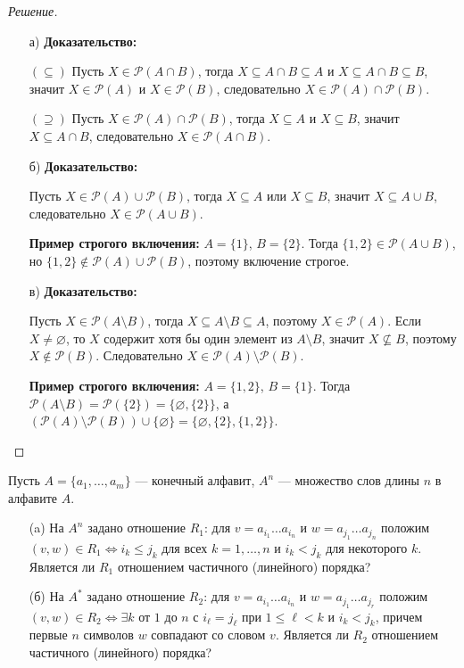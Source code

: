 \documentclass{article}
\begin{document}
\begin{proof}[Решение]\
\begin{enumerate}
    \item[а)] \textbf{Доказательство:}
    
    $(\subseteq)$ Пусть $X \in \mathcal{P}(A \cap B)$, тогда $X \subseteq A \cap B \subseteq A$ и $X \subseteq A \cap B \subseteq B$, значит $X \in \mathcal{P}(A)$ и $X \in \mathcal{P}(B)$, следовательно $X \in \mathcal{P}(A) \cap \mathcal{P}(B)$.
    
    $(\supseteq)$ Пусть $X \in \mathcal{P}(A) \cap \mathcal{P}(B)$, тогда $X \subseteq A$ и $X \subseteq B$, значит $X \subseteq A \cap B$, следовательно $X \in \mathcal{P}(A \cap B)$.
    
    \item[б)] \textbf{Доказательство:}
    
    Пусть $X \in \mathcal{P}(A) \cup \mathcal{P}(B)$, тогда $X \subseteq A$ или $X \subseteq B$, значит $X \subseteq A \cup B$, следовательно $X \in \mathcal{P}(A \cup B)$.
    
    \textbf{Пример строгого включения:} $A = \{1\}$, $B = \{2\}$. Тогда $\{1,2\} \in \mathcal{P}(A \cup B)$, но $\{1,2\} \notin \mathcal{P}(A) \cup \mathcal{P}(B)$, поэтому включение строгое.
    
    \item[в)]\textbf{Доказательство:}
    
    Пусть $X \in \mathcal{P}(A \setminus B)$, тогда $X \subseteq A \setminus B \subseteq A$, поэтому $X \in \mathcal{P}(A)$. Если $X \neq \varnothing$, то $X$ содержит хотя бы один элемент из $A \setminus B$, значит $X \not\subseteq B$, поэтому $X \notin \mathcal{P}(B)$. Следовательно $X \in \mathcal{P}(A) \setminus \mathcal{P}(B)$.
    
    \textbf{Пример строгого включения:} $A = \{1,2\}$, $B = \{1\}$. Тогда $\mathcal{P}(A \setminus B) = \mathcal{P}(\{2\}) = \{\varnothing, \{2\}\}$, а $(\mathcal{P}(A) \setminus \mathcal{P}(B)) \cup \{\varnothing\} = \{\varnothing, \{2\}, \{1,2\}\}$.
\end{enumerate}
\end{proof}

\begin{task}[3]
Пусть $A = \{a_1, \ldots, a_m\}$ — конечный алфавит, $A^n$ — множество слов длины $n$ в алфавите $A$.
\begin{enumerate}
    \item[(a)] На $A^n$ задано отношение $R_1$: для $v = a_{i_1}\ldots a_{i_n}$ и $w = a_{j_1}\ldots a_{j_n}$ положим $(v,w)\in R_1 \iff i_k\le j_k$ для всех $k=1,\dots,n$ и $i_k<j_k$ для некоторого $k$. Является ли $R_1$ отношением частичного (линейного) порядка?
    \item[(б)] На $A^*$ задано отношение $R_2$: для $v = a_{i_1}\ldots a_{i_n}$ и $w = a_{j_1}\ldots a_{j_r}$ положим $(v,w)\in R_2 \iff \exists k$ от $1$ до $n$ с $i_\ell=j_\ell$ при $1\le \ell<k$ и $i_k<j_k$, причем первые $n$ символов $w$ совпадают со словом $v$. Является ли $R_2$ отношением частичного (линейного) порядка?
\end{enumerate}
\end{task}
\end{document}

